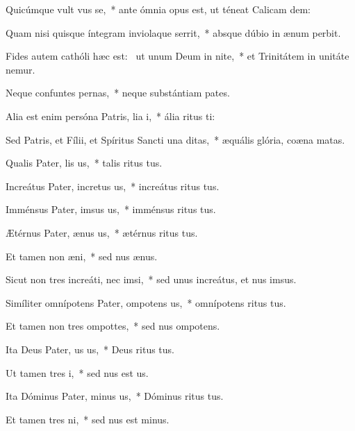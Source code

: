 \item Quicúmque vult vus se,~* ante ómnia opus est, ut téneat Calicam dem:
\item Quam nisi quisque íntegram inviolaque serrit,~* absque dúbio in ænum perbit.
\item Fides autem cathóli hæc est:~\pscross{} ut unum Deum in nite,~* et Trinitátem in unitáte nemur.
\item Neque confuntes pernas,~* neque substántiam pates.
\item Alia est enim persóna Patris, lia i,~* ália ritus ti:
\item Sed Patris, et Fílii, et Spíritus Sancti una  ditas,~* æquális glória, coæna matas.
\item Qualis Pater, lis us,~* talis ritus tus.
\item Increátus Pater, incretus us,~* increátus ritus tus.
\item Imménsus Pater, imsus us,~* imménsus ritus tus.
\item Ætérnus Pater, ænus us,~* ætérnus ritus tus.
\item Et tamen non  æni,~* sed nus ænus.
\item Sicut non tres increáti, nec  imsi,~* sed unus increátus, et nus imsus.
\item Simíliter omnípotens Pater, ompotens us,~* omnípotens ritus tus.
\item Et tamen non tres ompottes,~* sed nus ompotens.
\item Ita Deus Pater, us us,~* Deus ritus tus.
\item Ut tamen  tres i,~* sed nus est us.
\item Ita Dóminus Pater, minus us,~* Dóminus ritus tus.
\item Et tamen  tres ni,~* sed nus est minus.
